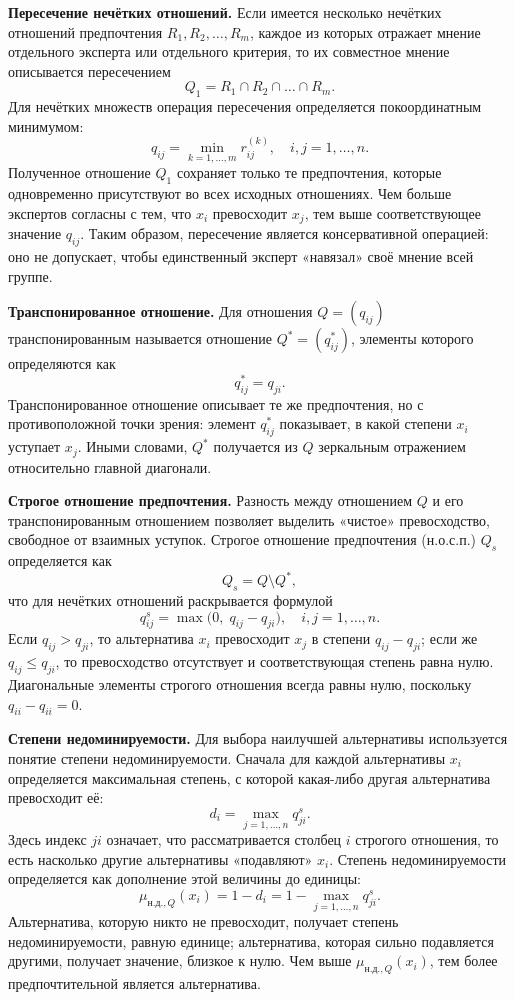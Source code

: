 \textbf{Пересечение нечётких отношений.} Если имеется несколько нечётких отношений предпочтения $R_1, R_2, \ldots, R_m$, каждое из которых отражает мнение отдельного эксперта или отдельного критерия, то их совместное мнение описывается пересечением
\[
Q_1 = R_1 \cap R_2 \cap \ldots \cap R_m.
\]
Для нечётких множеств операция пересечения определяется покоординатным минимумом:
\[
q_{ij} = \min_{k=1,\ldots,m} r_{ij}^{(k)}, \quad i,j = 1,\ldots,n.
\]
Полученное отношение $Q_1$ сохраняет только те предпочтения, которые одновременно присутствуют во всех исходных отношениях. Чем больше экспертов согласны с тем, что $x_i$ превосходит $x_j$, тем выше соответствующее значение $q_{ij}$. Таким образом, пересечение является консервативной операцией: оно не допускает, чтобы единственный эксперт «навязал» своё мнение всей группе.

\textbf{Транспонированное отношение.} Для отношения $Q = (q_{ij})$ транспонированным называется отношение $Q^{*} = (q_{ij}^{*})$, элементы которого определяются как
\[
q_{ij}^{*} = q_{ji}.
\]
Транспонированное отношение описывает те же предпочтения, но с противоположной точки зрения: элемент $q_{ij}^{*}$ показывает, в какой степени $x_i$ уступает $x_j$. Иными словами, $Q^{*}$ получается из $Q$ зеркальным отражением относительно главной диагонали.

\textbf{Строгое отношение предпочтения.} Разность между отношением $Q$ и его транспонированным отношением позволяет выделить «чистое» превосходство, свободное от взаимных уступок. Строгое отношение предпочтения (н.о.с.п.) $Q_s$ определяется как
\[
Q_s = Q \setminus Q^{*},
\]
что для нечётких отношений раскрывается формулой
\[
q^{s}_{ij} = \max\bigl(0,\; q_{ij} - q_{ji}\bigr), \quad i,j = 1,\ldots,n.
\]
Если $q_{ij} > q_{ji}$, то альтернатива $x_i$ превосходит $x_j$ в степени $q_{ij} - q_{ji}$; если же $q_{ij} \le q_{ji}$, то превосходство отсутствует и соответствующая степень равна нулю. Диагональные элементы строгого отношения всегда равны нулю, поскольку $q_{ii} - q_{ii} = 0$.

\textbf{Степени недоминируемости.} Для выбора наилучшей альтернативы используется понятие степени недоминируемости. Сначала для каждой альтернативы $x_i$ определяется максимальная степень, с которой какая-либо другая альтернатива превосходит её:
\[
d_i = \max_{j=1,\ldots,n} q^{s}_{ji}.
\]
Здесь индекс $ji$ означает, что рассматривается столбец $i$ строгого отношения, то есть насколько другие альтернативы «подавляют» $x_i$. Степень недоминируемости определяется как дополнение этой величины до единицы:
\[
\mu_{\text{н.д.},Q}(x_i) = 1 - d_i = 1 - \max_{j=1,\ldots,n} q^{s}_{ji}.
\]
Альтернатива, которую никто не превосходит, получает степень недоминируемости, равную единице; альтернатива, которая сильно подавляется другими, получает значение, близкое к нулю. Чем выше $\mu_{\text{н.д.},Q}(x_i)$, тем более предпочтительной является альтернатива.

